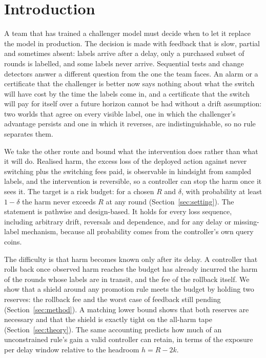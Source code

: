 \documentclass{article}
\theoremstyle{plain}
\theoremstyle{definition}
\begin{document}
\section{Introduction}
A team that has trained a challenger model must decide when to let it replace the model in production.
The decision is made with feedback that is slow, partial and sometimes absent: labels arrive after a delay, only a purchased subset of rounds is labelled, and some labels never arrive.
Sequential tests and change detectors answer a different question from the one the team faces.
An alarm or a certificate that the challenger is better now says nothing about what the switch will have cost by the time the labels come in, and a certificate that the switch will pay for itself over a future horizon cannot be had without a drift assumption: two worlds that agree on every visible label, one in which the challenger's advantage persists and one in which it reverses, are indistinguishable, so no rule separates them.

We take the other route and bound what the intervention does rather than what it will do.
Realised harm, the excess loss of the deployed action against never switching plus the switching fees paid, is observable in hindsight from sampled labels, and the intervention is reversible, so a controller can stop the harm once it sees it.
The target is a risk budget: for a chosen $R$ and $\delta$, with probability at least $1-\delta$ the harm never exceeds $R$ at any round (Section~\ref{sec:setting}).
The statement is pathwise and design-based.
It holds for every loss sequence, including arbitrary drift, reversals and dependence, and for any delay or missing-label mechanism, because all probability comes from the controller's own query coins.

The difficulty is that harm becomes known only after its delay.
A controller that rolls back once observed harm reaches the budget has already incurred the harm of the rounds whose labels are in transit, and the fee of the rollback itself.
We show that a shield around any promotion rule meets the budget by holding two reserves: the rollback fee and the worst case of feedback still pending (Section~\ref{sec:method}).
A matching lower bound shows that both reserves are necessary and that the shield is exactly tight on the all-harm tape (Section~\ref{sec:theory}).
The same accounting predicts how much of an unconstrained rule's gain a valid controller can retain, in terms of the exposure per delay window relative to the headroom $h=R-2k$.
\end{document}
